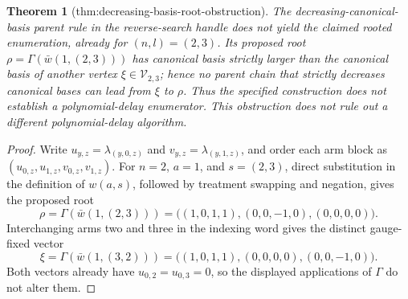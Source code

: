 \documentclass{article}
\newtheorem{theorem}{Theorem}
\begin{document}
\begin{theorem}[thm:decreasing-basis-root-obstruction]\label{thm:decreasing-basis-root-obstruction}
The decreasing-canonical-basis parent rule in the reverse-search handle does not yield the claimed rooted enumeration, already for \((n,l)=(2,3)\). Its proposed root \(\rho=\Gamma(\bar w(1,(2,3)))\) has canonical basis strictly larger than the canonical basis of another vertex \(\xi\in\mathcal V_{2,3}\); hence no parent chain that strictly decreases canonical bases can lead from \(\xi\) to \(\rho\). Thus the specified construction does not establish a polynomial-delay enumerator. This obstruction does not rule out a different polynomial-delay algorithm.
\end{theorem}
\begin{proof}
Write \(u_{y,z}=\lambda_{(y,0,z)}\) and \(v_{y,z}=\lambda_{(y,1,z)}\), and order each arm block as \((u_{0,z},u_{1,z},v_{0,z},v_{1,z})\). For \(n=2\), \(a=1\), and \(s=(2,3)\), direct substitution in the definition of \(w(a,s)\), followed by treatment swapping and negation, gives the proposed root
\[
\rho=\Gamma(\bar w(1,(2,3)))=\bigl((1,0,1,1),(0,0,-1,0),(0,0,0,0)\bigr).
\]
Interchanging arms two and three in the indexing word gives the distinct gauge-fixed vector
\[
\xi=\Gamma(\bar w(1,(3,2)))=\bigl((1,0,1,1),(0,0,0,0),(0,0,-1,0)\bigr).
\]
Both vectors already have \(u_{0,2}=u_{0,3}=0\), so the displayed applications of \(\Gamma\) do not alter them.


\end{proof}
\end{document}
